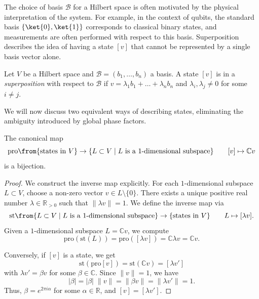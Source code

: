 \documentclass[a4paper,oneside, 12pt]{amsart}
\begin{document}
The choice of basis \(\mathcal{B}\) for a Hilbert space is often motivated by the physical interpretation of the system.
For example, in the context of qubits, the standard basis \( \{\ket{0}, \ket{1}\} \) corresponds to classical binary states, and measurements are often performed with respect to this basis.
Superposition describes the idea of having a state \([v]\) that cannot be represented by a single basis vector alone.

\begin{definition}\label{def:superposition} %
  Let \(V\) be a Hilbert space and \(\mathcal{B}= (b_1, \dots, b_n)\) a basis.
  A state \([v]\) is in a \emph{superposition} with respect to \(\mathcal{B}\) if  \(v = \lambda_{1} b_{1} + \dots +\lambda_{n}b_{n}\) and \(\lambda_{i}, \lambda_{j}\neq 0\) for some \(i\neq j\).
\end{definition}

We will now discuss two equivalent ways of describing states, eliminating the ambiguity introduced by global phase factors.

\begin{lemma}\label{lem:projective-space-and-phases}
  The canonical map
  \begin{equation}
    \mathrm{pro} \from \{\text{states in } V\} \to\{L\subset V\mid L \text{ is a 1-dimensional subspace}\} \qquad
    [v]\mapsto \mathbb{C} v %
  \end{equation}
  is a bijection.
\end{lemma}
\begin{proof}
  We construct the inverse map explicitly.
  For each \(1\)-dimensional subspace \( L \subset V \), choose a non-zero vector \( v \in L \setminus \{0\} \).
  There exists a unique positive real number \( \lambda \in \mathbb{R}_{>0} \) such that \( \|\lambda v\| = 1 \).
  We define the inverse map via
  \begin{equation*}
    \mathrm{st} \from \{L\subset V\mid L \text{ is a 1-dimensional subspace}\} \to \{\text{states in } V\} \qquad L \mapsto [\lambda v].
  \end{equation*}
  Given a \(1\)-dimensional subspace \( L = \mathbb{C} v \), we compute
  \begin{equation*}
    \mathrm{pro}(\mathrm{st}(L)) = \mathrm{pro}([\lambda v]) = \mathbb{C} \lambda v = \mathbb{C} v.
  \end{equation*}

  Conversely, if \([v]\) is a state, we get
  \begin{equation*}
    \mathrm{st}(\mathrm{pro}[v]) = \mathrm{st}( \mathbb{C} v) = [\lambda v']
  \end{equation*}
  with \(\lambda v' =\beta v\) for some \(\beta \in \mathbb{C}\).
  Since \( \|v\| = 1 \), we have
  \begin{equation*}
    |\beta| = |\beta| \;\|v\| = \|\beta v\| = \|\lambda v'\| = 1.
  \end{equation*}
  Thus, \( \beta = e^{2\pi i \alpha} \) for some \( \alpha \in \mathbb{R} \), and \( [v] = [\lambda v'] \).
\end{proof}
\end{document}
